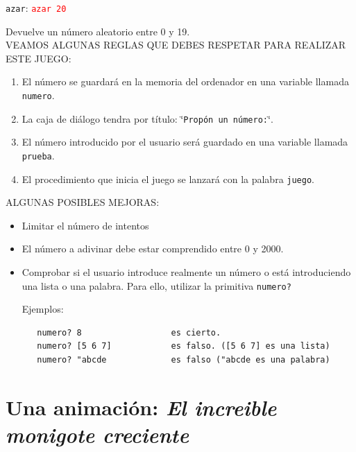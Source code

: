 \documentclass[12pt,twoside,spanish,a4paper]{report}
\begin{document}
\texttt{azar}: \hspace{4cm} \textcolor{red}{\texttt{azar 20}}

Devuelve un n\'umero aleatorio entre 0 y 19. \\

\noindent VEAMOS ALGUNAS REGLAS QUE DEBES RESPETAR PARA REALIZAR ESTE JUEGO:
\begin{enumerate}
   \item El n\'umero se guardar\'a en la memoria del ordenador en una variable
      llamada \texttt{numero}.
   \item La caja de di\'alogo tendra por t\'itulo: \char`\"{}\texttt{Prop\'on un
      n\'umero:}\char`\"{}.
   \item El n\'umero introducido por el usuario ser\'a guardado en una variable
      llamada \texttt{prueba}.
   \item El procedimiento que inicia el juego se lanzar\'a con la palabra
      \texttt{juego}.
\end{enumerate}
ALGUNAS POSIBLES MEJORAS:
\begin{itemize}
   \item Limitar el n\'umero de intentos
   \item El n\'umero a adivinar debe estar comprendido entre 0 y 2000.
   \item Comprobar si el usuario introduce realmente un n\'umero o est\'a
      introduciendo una lista o una palabra. Para ello, utilizar la primitiva
      \texttt{numero?}

      Ejemplos:
      \begin{verbatim}
   numero? 8                  es cierto.
   numero? [5 6 7]            es falso. ([5 6 7] es una lista)
   numero? "abcde             es falso ("abcde es una palabra) \end{verbatim}
\end{itemize}

\newpage{}

\chapter{Una animaci\'on: \textit{El increible monigote creciente}}
   \label{sec:Monigote}
\end{document}
